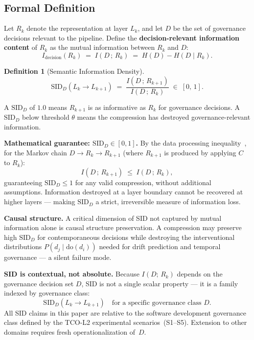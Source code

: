 \documentclass[11pt]{article}
\theoremstyle{definition}
\newtheorem{definition}{Definition}
\theoremstyle{remark}
\begin{document}
\subsection{Formal Definition}

Let $R_k$ denote the representation at layer $L_k$, and let $D$ be
the set of governance decisions relevant to the pipeline. Define the
\textbf{decision-relevant information content} of $R_k$ as the
mutual information between $R_k$ and $D$:
\[
  I_\mathrm{decision}(R_k)
    \;=\; I(D\,;\, R_k)
    \;=\; H(D) - H(D \mid R_k).
\]

\begin{definition}[Semantic Information Density]
\[
  \mathrm{SID}_D(L_k \to L_{k+1})
    \;=\; \frac{I(D\,;\, R_{k+1})}{I(D\,;\, R_k)}
    \;\in\; [0,\,1].
\]
\end{definition}

A $\text{SID}_D$ of $1.0$ means $R_{k+1}$ is as informative as
$R_k$ for governance decisions. A $\text{SID}_D$ below threshold
$\theta$ means the compression has destroyed governance-relevant
information.

\medskip
\noindent\textbf{Mathematical guarantee: $\text{SID}_D \in [0,1]$.}
By the data processing inequality~\cite{cover2006elements}, for the
Markov chain $D \to R_k \to R_{k+1}$ (where $R_{k+1}$ is produced
by applying $C$ to $R_k$):
\[
  I(D\,;\, R_{k+1}) \;\leq\; I(D\,;\, R_k),
\]
guaranteeing $\text{SID}_D \leq 1$ for any valid compression,
without additional assumptions. Information destroyed at a layer
boundary cannot be recovered at higher layers --- making
$\text{SID}_D$ a strict, irreversible measure of information loss.

\medskip
\noindent\textbf{Causal structure.} A critical dimension of SID not
captured by mutual information alone is causal structure
preservation. A compression may preserve high $\text{SID}_D$ for
contemporaneous decisions while destroying the interventional
distributions $P(d_j \mid \mathrm{do}(d_i))$ needed for drift
prediction and temporal governance --- a silent failure mode.

\medskip
\noindent\textbf{SID is contextual, not absolute.} Because
$I(D;\,R_k)$ depends on the governance decision set $D$, SID is
not a single scalar property --- it is a family indexed by governance
class:
\[
  \mathrm{SID}_D(L_k \to L_{k+1})
    \quad \text{for a specific governance class } D.
\]
All SID claims in this paper are relative to the software
development governance class defined by the TCO-L2 experimental
scenarios~(S1--S5). Extension to other domains requires fresh
operationalization of~$D$.
\end{document}

